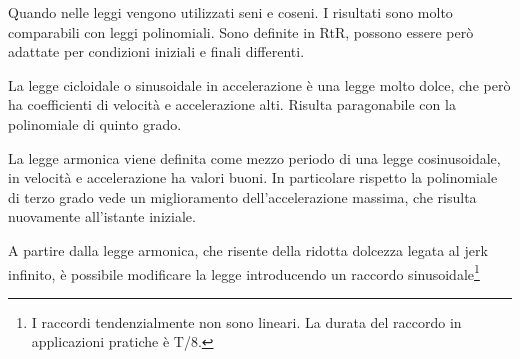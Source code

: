 Quando nelle leggi vengono utilizzati seni e coseni. I risultati sono molto comparabili con leggi polinomiali.
Sono definite in RtR, possono essere però adattate per condizioni iniziali e finali differenti.

La legge cicloidale o sinusoidale in accelerazione è una legge molto dolce, che però ha coefficienti di velocità e accelerazione alti. Risulta paragonabile con la polinomiale di quinto grado.

La legge armonica viene definita come mezzo periodo di una legge cosinusoidale, in velocità e accelerazione ha valori buoni. In particolare rispetto la polinomiale di terzo grado vede un miglioramento dell'accelerazione massima, che risulta nuovamente all'istante iniziale.

A partire dalla legge armonica, che risente della ridotta dolcezza legata al jerk infinito, è possibile modificare la legge introducendo un raccordo sinusoidale\footnote{I raccordi tendenzialmente non sono lineari. La durata del raccordo in applicazioni pratiche è T/8.}